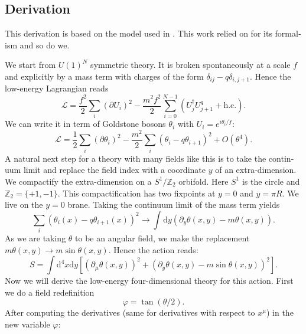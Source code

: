 \documentclass[master,       %
               twoside,        %
               BCOR10mm,       %
               english,ngerman, %
               ]{GAUBM}
\begin{document}
\begin{otherlanguage}{english}
\subsection{Derivation}
This derivation is based on the model used in \cite{Deformed_potential_Bae_2019}. This work relied on \cite{general_cont_clockwork_Choi_2018} for its formalism and so do we.

We start from $U(1)^N$ symmetric theory. It is broken spontaneously at a scale $f$ and explicitly by a mass term with charges of the form $\delta_{ij} - q \delta_{i,j+1}$. Hence the low-energy Lagrangian reads
\begin{equation}
	\mathcal{L} = \frac{f^2}{2} \sum_i (\partial U_i)^2 - \frac{m^2 f^2}{2} \sum_{i = 0}^{N - 1} (U_j^\dagger U^q_{j + 1} + \mathrm{h.c.}).
\end{equation}
We can write it in term of Goldstone bosons $\theta_i$ with $U_i = e^{i \theta_i/ f}$:
\begin{equation}
	\mathcal{L} = \frac{1}{2} \sum_i (\partial \theta_i)^2 - \frac{m^2}{2} \sum_i (\theta_i - q \theta_{i + 1})^2 + O(\theta^4).
\end{equation}
A natural next step for a theory with many fields like this is to take the continuum limit and replace the field index with a coordinate $y$ of an extra-dimension.
We compactify the extra-dimension on a $S^1 / \mathbb{Z}_2$ orbifold. Here $S^1$ is the circle and $\mathbb{Z}_2 = \{+1, -1\}$. This compactification has two fixpoints at $y = 0$ and $y = \pi R$. We live on the $y = 0$ brane.
Taking the continuum limit of the mass term yields
\begin{equation}
	\sum_i (\theta_i(x) - q \theta_{i + 1}(x))^2 \to \int \mathrm{d} y (\partial_y \theta(x, y) - m \theta(x, y) ).
\end{equation}
As we are taking $\theta$ to be an angular field, we make the replacement $m \theta(x, y) \to m \sin \theta(x, y)$.
Hence the action reads:
\begin{equation}
	S = \int \mathrm{d}^4 x \mathrm{d} y \left[ (\partial_\mu \theta(x, y))^2 + (\partial_y \theta(x, y) - m \sin \theta(x, y))^2 \right].
\end{equation}
Now we will derive the low-energy four-dimensional theory for this action.
First we do a field redefinition
\begin{equation}
	\varphi = \tan ( \theta / 2 ).
\end{equation}
After computing the derivatives (same for derivatives with respect to $x^\mu$) in the new variable $\varphi$:
\begin{align}

\end{align}
\end{otherlanguage}
\end{document}
